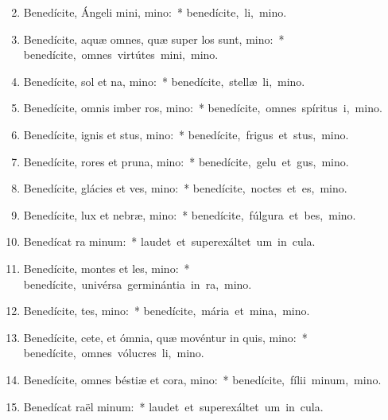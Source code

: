 \begin{flushleft}
\begin{enumerate}[leftmargin=*]
\setcounter{enumi}{1}


\item Benedícite, Ángeli mini, mino:~* \mbox{benedícite, li, mino.}
\item Benedícite, aquæ omnes, quæ super los sunt, mino:~* \mbox{benedícite, omnes virtútes mini, mino.}
\item Benedícite, sol et na, mino:~* \mbox{benedícite, stellæ li, mino.}
\item Benedícite, omnis imber  ros, mino:~* \mbox{benedícite, omnes spíritus i, mino.}
\item Benedícite, ignis et stus, mino:~* \mbox{benedícite, frigus et stus, mino.}
\item Benedícite, rores et pruna, mino:~* \mbox{benedícite, gelu et gus, mino.}
\item Benedícite, glácies et ves, mino:~* \mbox{benedícite, noctes et es, mino.}
\item Benedícite, lux et nebræ, mino:~* \mbox{benedícite, fúlgura et bes, mino.}
\item Benedícat ra minum:~* \mbox{laudet et superexáltet um in cula.}
\item Benedícite, montes et les, mino:~* \mbox{benedícite, univérsa germinántia in ra, mino.}
\item Benedícite, tes, mino:~* \mbox{benedícite, mária et mina, mino.}
\item Benedícite, cete, et ómnia, quæ movéntur in quis, mino:~* \mbox{benedícite, omnes vólucres li, mino.}
\item Benedícite, omnes béstiæ et cora, mino:~* \mbox{benedícite, fílii minum, mino.}
\item Benedícat raël minum:~* \mbox{laudet et superexáltet um in cula.}

\end{enumerate}
\end{flushleft}
